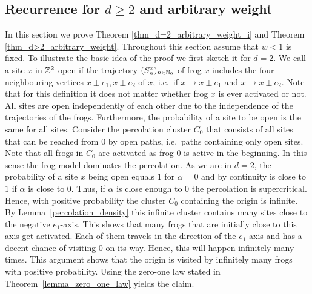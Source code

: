 
\subsection*{Recurrence for $d \geq 2$ and arbitrary weight}
In this section we prove Theorem \ref{thm_d=2_arbitrary_weight_i} and Theorem \ref{thm_d>2_arbitrary_weight}. Throughout this section assume that $w <1$ is fixed. 
To illustrate the basic idea of the proof we first sketch it for $d=2$. We call a site $x$ in $\mathbb{Z}^2$ open if the trajectory $(S_n^x)_{n \in \mathbb{N}_0}$ of frog $x$ includes the four neighbouring vertices $x \pm e_1, x \pm e_2$ of $x$, i.e.~if $x \to x \pm e_1$ and $x \to x \pm e_2$. Note that for this definition it does not matter whether frog $x$ is ever activated or not. All sites are open independently of each other due to the independence of the trajectories of the frogs. Furthermore, the probability of a site to be open is the same for all sites. Consider the percolation cluster $C_0$ that consists of all sites that can be reached from $0$ by open paths, i.e.~paths containing only open sites. Note that all frogs in $C_0$ are activated as frog $0$ is active in the beginning. In this sense the frog model dominates the percolation.
As we are in $d=2$, the probability of a site $x$ being open equals $1$ for $\alpha=0$ and by continuity is close to $1$ if $\alpha$ is close to $0$. Thus, if $\alpha$ is close enough to $0$ the percolation is supercritical. 
Hence, with positive probability the cluster $C_0$ containing the origin is infinite. By Lemma~\ref{percolation_density} this infinite cluster contains many sites close to the negative $e_1$-axis. This shows that many frogs that are initially close to this axis get activated. Each of them travels in the direction of the $e_1$-axis and has a decent chance of visiting $0$ on its way. Hence, this will happen infinitely many times. This argument shows that the origin is visited by infinitely many frogs with positive probability. Using the zero-one law stated in Theorem~\ref{lemma_zero_one_law} yields the claim.

